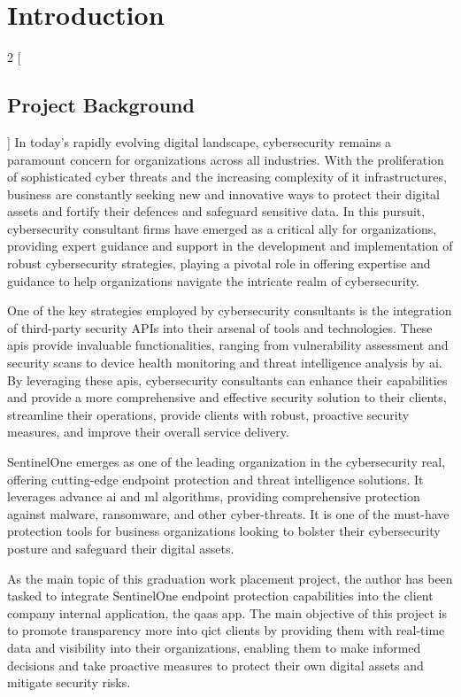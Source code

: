 \chapter{Introduction}
\begin{multicols}{2}
      [\section{Project Background}]
      In today's rapidly evolving digital landscape, cybersecurity remains a paramount concern for organizations
      across all industries. With the proliferation of sophisticated cyber threats and the increasing complexity of
      \acrshort{it} infrastructures, business are constantly seeking new and innovative ways to protect their
      digital assets and fortify their defences and safeguard sensitive data. In this pursuit, cybersecurity
      consultant firms have emerged as a critical ally for organizations, providing expert guidance and support in
      the development and implementation of robust cybersecurity strategies, playing a pivotal role in offering
      expertise and guidance to help organizations navigate the intricate realm of cybersecurity.

      One of the key strategies employed by cybersecurity consultants is the integration of third-party security
      \gls{API}s into their arsenal of tools and technologies. These \acrshort{api}s provide invaluable
      functionalities, ranging from vulnerability assessment and security scans to device health monitoring and
      threat intelligence analysis by \acrshort{ai}. By leveraging these \acrshort{api}s, cybersecurity consultants
      can enhance their capabilities and provide a more comprehensive and effective security solution to their
      clients, streamline their operations, provide clients with robust, proactive security measures, and improve
      their overall service delivery.

      SentinelOne emerges as one of the leading organization in the cybersecurity real, offering cutting-edge
      endpoint protection and threat intelligence solutions. It leverages advance \acrshort{ai} and \acrshort{ml}
      algorithms, providing comprehensive protection against malware, ransomware, and other cyber-threats. It is one
      of the must-have protection tools for business organizations looking to bolster their cybersecurity posture
      and safeguard their digital assets.

      As the main topic of this graduation work placement project, the author
      has been tasked to integrate SentinelOne endpoint protection capabilities into the client company internal
      application, the \acrshort{qaas} app. The main objective of this project is to promote transparency more
      into \acrshort{qict} clients by providing them with real-time data and visibility into their organizations,
      enabling them to make informed decisions and take proactive measures to protect their own digital assets and
      mitigate security risks.


\end{multicols}
